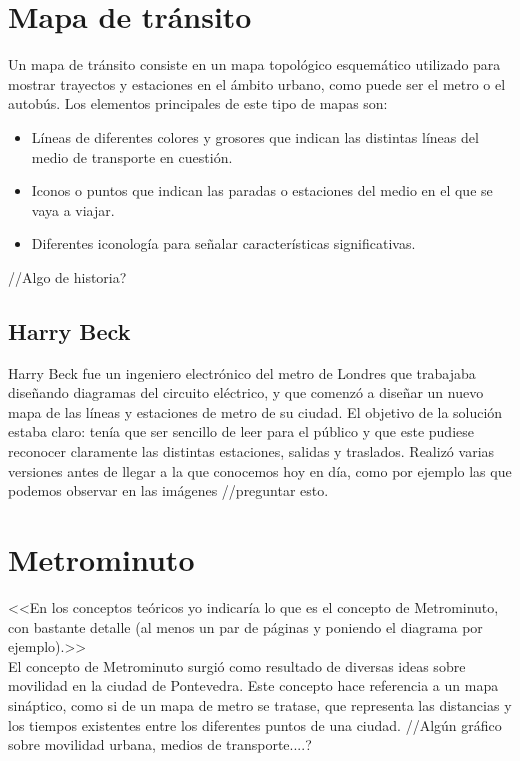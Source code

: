 

\section{Mapa de tránsito}
Un mapa de tránsito consiste en un mapa topológico esquemático utilizado para mostrar trayectos y estaciones en el ámbito urbano, como puede ser el metro o el autobús. Los elementos principales de este tipo de mapas son:
\begin{itemize}
	\item Líneas de diferentes colores y grosores que indican las distintas líneas del medio de transporte en cuestión.
	\item Iconos o puntos que indican las paradas o estaciones del medio en el que se vaya a viajar.
	\item Diferentes iconología para señalar características significativas.
\end{itemize}
//Algo de historia?


\subsection{Harry Beck}
Harry Beck fue un ingeniero electrónico del metro de Londres que trabajaba diseñando diagramas del circuito eléctrico, y que comenzó a diseñar un nuevo mapa de las líneas y estaciones de metro de su ciudad. El objetivo de la solución estaba claro: tenía que ser sencillo de leer para el público y que este pudiese reconocer claramente las distintas estaciones, salidas y traslados.
Realizó varias versiones antes de llegar a la que conocemos hoy en día, como por ejemplo las que podemos observar en las imágenes //preguntar esto.

\section{Metrominuto}
<<En los conceptos teóricos yo indicaría lo que es el concepto de Metrominuto, con bastante detalle (al menos un par de páginas y poniendo el diagrama por ejemplo).>>
\\
El concepto de Metrominuto surgió como resultado de diversas ideas sobre movilidad en la ciudad de Pontevedra. Este concepto hace referencia a un mapa sináptico, como si de un mapa de metro se tratase, que representa las distancias y los tiempos existentes entre los diferentes puntos de una ciudad. 
//Algún gráfico sobre movilidad urbana, medios de transporte....?

